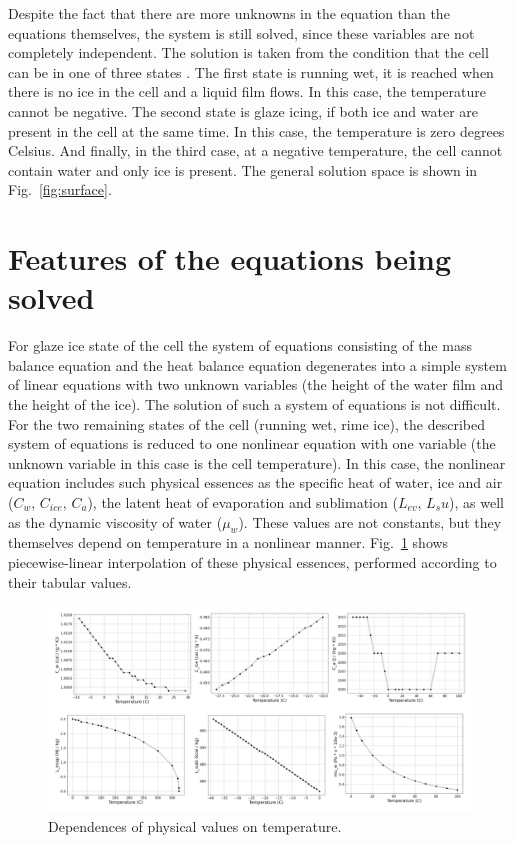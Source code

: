 \documentclass[
11pt,%
tightenlines,%
twoside,%
onecolumn,%
nofloats,%
nobibnotes,%
nofootinbib,%
superscriptaddress,%
noshowpacs,%
centertags]%
{revtex4}
\begin{document}
Despite the fact that there are more unknowns in the equation than the equations themselves, the system is still solved, since these variables are not completely independent.
The solution is taken from the condition that the cell can be in one of three states \cite{Ozgen}.
The first state is running wet, it is reached when there is no ice in the cell and a liquid film flows.
In this case, the temperature cannot be negative.
The second state is glaze icing, if both ice and water are present in the cell at the same time.
In this case, the temperature is zero degrees Celsius.
And finally, in the third case, at a negative temperature, the cell cannot contain water and only ice is present.
The general solution space is shown in Fig.~\ref{fig:surface}.

\section{Features of the equations being solved}

For glaze ice state of the cell the system of equations consisting of the mass balance equation and the heat balance equation degenerates into a simple system of linear equations with two unknown variables (the height of the water film and the height of the ice).
The solution of such a system of equations is not difficult.
For the two remaining states of the cell (running wet, rime ice), the described system of equations is reduced to one nonlinear equation with one variable (the unknown variable in this case is the cell temperature).
In this case, the nonlinear equation includes such physical essences as the specific heat of water, ice and air ($C_w$, $C_{ice}$, $C_a$), the latent heat of evaporation and sublimation ($L_{ev}$, $L_su$), as well as the dynamic viscosity of water ($\mu_w$).
These values are not constants, but they themselves depend on temperature in a nonlinear manner.
Fig.~\ref{fig:ph_graphics_h} shows piecewise-linear interpolation of these physical essences, performed according to their tabular values.

\begin{figure}[h]
\setcaptionmargin{5mm}
\onelinecaptionstrue
\includegraphics[width=1.0\textwidth]{pics/ph_graphics_h.pdf}
\caption{Dependences of physical values on temperature.}\label{fig:ph_graphics_h}
\end{figure}
\end{document}
